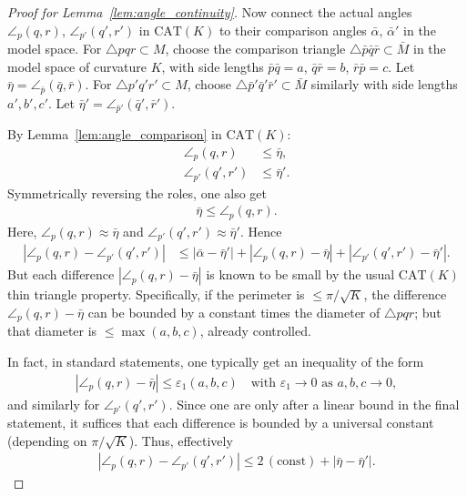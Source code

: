 \begin{proof}[Proof for Lemma~\ref{lem:angle_continuity}]
    Now connect the actual angles $\angle_p(q,r)$, $\angle_{p'}(q',r')$ in $\mathrm{CAT}(K)$ to their comparison angles $\bar{\alpha}$, $\bar{\alpha}'$ in the model space.  For $\triangle pqr\subset M$, choose the comparison triangle $\triangle \bar{p}\bar{q}\bar{r}\subset \bar{M}$ in the model space of curvature $K$, with side lengths $\bar{p}\bar{q}=a$, $\bar{q}\bar{r}=b$, $\bar{r}\bar{p}=c$.
    Let $\bar{\eta} = \angle_{\bar{p}}(\bar{q},\bar{r})$.  
    For $\triangle p'q'r'\subset M$, choose $\triangle \bar{p}'\bar{q}'\bar{r}'\subset \bar{M}$ similarly with side lengths $a',b',c'$.
    Let $\bar{\eta}' = \angle_{\bar{p}'}(\bar{q}',\bar{r}')$.  
    
    By Lemma~\ref{lem:angle_comparison} in $\mathrm{CAT}(K)$:
    \begin{align*}
        \angle_p(q,r) &\leq \bar{\eta}, \\
        \angle_{p'}(q',r') &\leq \bar{\eta}'.
    \end{align*}
    Symmetrically reversing the roles, one also get
    \begin{align*}
        \bar{\eta} \leq \angle_p(q,r).
    \end{align*}
    Here, $\angle_p(q,r)\approx \bar{\eta}$ and $\angle_{p'}(q',r')\approx \bar{\eta}'$.  
    Hence
    \begin{align*}
        |\angle_p(q,r) - \angle_{p'}(q',r')| &\leq |\bar{\alpha} - \bar{\eta}'| + |\angle_p(q,r) - \bar{\eta}| + |\angle_{p'}(q',r') - \bar{\eta}'|.
    \end{align*}
    But each difference $|\angle_p(q,r)-\bar{\eta}|$ is known to be small by the usual $\mathrm{CAT}(K)$ thin triangle property. 
    Specifically, if the perimeter is $\le \pi/\sqrt{K}$, the difference $\angle_p(q,r)-\bar{\eta}$ can be bounded by a constant times the diameter of $\triangle pqr$; but that diameter is $\le \max(a,b,c)$, already controlled.  

    In fact, in standard statements, one typically get an inequality of the form
    \begin{align*}
        |\angle_p(q,r) - \bar{\eta}| \leq  \varepsilon_1(a,b,c)\quad\text{with }\varepsilon_1\to0\text{ as }a,b,c\to0,
    \end{align*}
    and similarly for $\angle_{p'}(q',r')$.
    Since one are only after a linear bound in the final statement, it suffices that each difference is bounded by a universal constant (depending on $\pi/\sqrt{K}$).
    Thus, effectively
    \begin{align*}
        |\angle_p(q,r) - \angle_{p'}(q',r')| \leq 2\,(\text{const}) + |\bar{\eta} - \bar{\eta}'|.
    \end{align*}
    

\end{proof}
